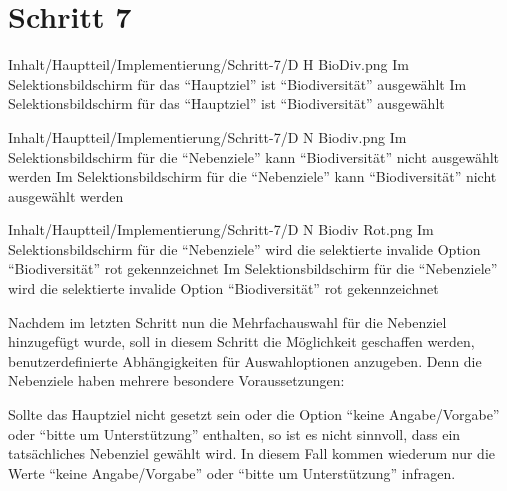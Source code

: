 \chapter{Schritt 7}
\label{chap:Schritt-7}

\begin{alexfigure}{Inhalt/Hauptteil/Implementierung/Schritt-7/D H BioDiv.png}
  {Im Selektionsbildschirm für das \enquote{Hauptziel} ist \enquote{Biodiversität} ausgewählt}
  {Im Selektionsbildschirm für das \enquote{Hauptziel} ist \enquote{Biodiversität} ausgewählt}

  \label{fig:Schritt4Eingabemaske}

\end{alexfigure}

\begin{alexfigure}{Inhalt/Hauptteil/Implementierung/Schritt-7/D N Biodiv.png}
  {Im Selektionsbildschirm für die \enquote{Nebenziele} kann \enquote{Biodiversität} nicht ausgewählt werden}
  {Im Selektionsbildschirm für die \enquote{Nebenziele} kann \enquote{Biodiversität} nicht ausgewählt werden}

  \label{fig:Schritt4Eingabemaske}

\end{alexfigure}


\begin{alexfigure}{Inhalt/Hauptteil/Implementierung/Schritt-7/D N Biodiv Rot.png}
  {Im Selektionsbildschirm für die \enquote{Nebenziele} wird die selektierte invalide Option \enquote{Biodiversität} rot gekennzeichnet}
  {Im Selektionsbildschirm für die \enquote{Nebenziele} wird die selektierte invalide Option \enquote{Biodiversität} rot gekennzeichnet}

  \label{fig:Schritt4Eingabemaske}

\end{alexfigure}

Nachdem im letzten Schritt nun die Mehrfachauswahl für die Nebenziel hinzugefügt wurde,
soll in diesem Schritt die Möglichkeit geschaffen werden,
benutzerdefinierte Abhängigkeiten für Auswahloptionen anzugeben.
Denn die Nebenziele haben mehrere besondere Voraussetzungen:

Sollte das Hauptziel nicht gesetzt sein oder die Option \enquote{keine Angabe/Vorgabe} oder \enquote{bitte um Unterstützung} enthalten,
so ist es nicht sinnvoll, dass ein tatsächliches Nebenziel gewählt wird.
In diesem Fall kommen wiederum nur die Werte \enquote{keine Angabe/Vorgabe} oder \enquote{bitte um Unterstützung} infragen.

